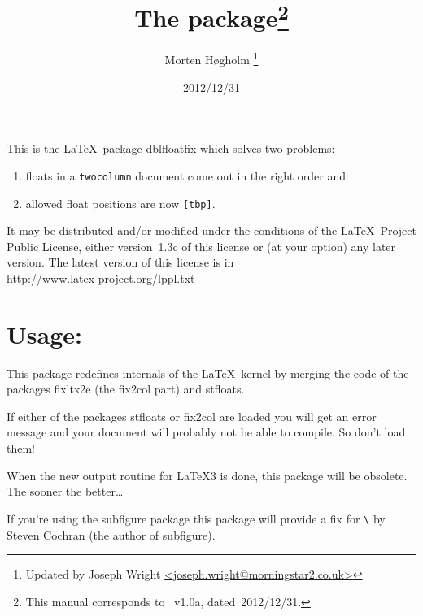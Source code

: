 \documentclass[DIV=8, pagesize=auto]{scrartcl}
\title{The \pkg{dblfloatfix} package\thanks{This manual corresponds to \pkg{dblfloatfix}~v1.0a, dated~2012/12/31.}}
\author{Morten Høgholm%
  \thanks{Updated by Joseph Wright
    \href{mailto:joseph.wright@morningstar2.co.uk}
    {<joseph.wright@morningstar2.co.uk>}}}
\date{2012/12/31}
\makeatletter
\newcommand*{\pkg}[1]{\textsf{#1}}
\newcommand*{\cs}[1]{\texttt{\textbackslash#1}}
\newcommand*{\cmd}[1]{\cs{\expandafter\@gobble\string#1}}
\newcommand*{\opt}[1]{\texttt{#1}}
\makeatother
\begin{document}
\maketitle

\noindent
This is the \LaTeX\ package \pkg{dblfloatfix} which solves two problems:
%
\renewcommand*{\theenumi}{\alph{enumi}}%
\renewcommand*{\labelenumi}{\theenumi)}%
\begin{enumerate}
\item floats in a \opt{twocolumn} document come out in the right order and
\item allowed float positions are now \texttt{[tbp]}.
\end{enumerate}
%
It may be distributed and/or modified under the
conditions of the \LaTeX\ Project Public License, either version~1.3c
of this license or (at your option) any later version.
The latest version of this license is in\\
\url{http://www.latex-project.org/lppl.txt}


\section*{Usage:}

This package redefines internals of the \LaTeX\ kernel by merging
the code of the packages \pkg{fixltx2e} (the \pkg{fix2col} part) and \pkg{stfloats}.

If either of the packages \pkg{stfloats} or \pkg{fix2col} are loaded you will
get an error message and your document will probably not be able
to compile. So don't load them!

When the new output routine for \LaTeX3 is done, this package will
be obsolete. The sooner the better\ldots

If you're using the \pkg{subfigure} package this package will provide a
fix for \cmd{\end@dblfloat} by Steven Cochran (the author of \pkg{subfigure}).
\end{document}
